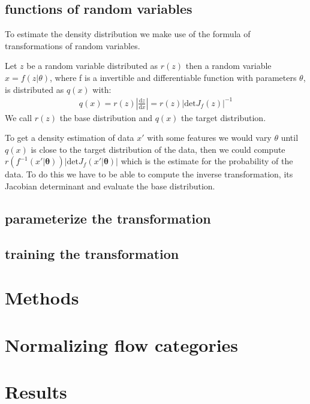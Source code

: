 \documentclass[%
 reprint,
 amsmath,amssymb,
 aps,
]{revtex4-2}
\begin{document}
\subsection{functions of random variables}
To estimate the density distribution we make use of the formula of  transformations of random variables. 

Let $z$ be a random variable distributed as $r(z)$ then a random variable $x = f(z|\theta)$, where f is a invertible and differentiable function with parameters $\theta$, is distributed as $q(x)$ with:
\begin{align*}
	q(x) = r(z)\left|\frac{\text{d} z}{\text{d} x}\right| = r(z)\left|\text{det}J_f(z)\right|^{-1}
\end{align*}
We call $r(z)$ the base distribution and $q(x)$ the target distribution.

To get a density estimation of data $x'$ with some features we would vary $\theta$ until $q(x)$ is close to the target distribution of the data, then we could compute $r(f^{-1}(x'|\mathbf{\theta}))\left|\text{det}J_f(x'|\mathbf{\theta})\right|$ which is the estimate for the probability of the data. To do this we have to be able to compute the inverse transformation, its Jacobian determinant and evaluate the base distribution.
\subsection{parameterize the transformation}
\subsection{training the transformation}



\section{Methods}



\section{Normalizing flow categories}

\section{Results}
\end{document}
